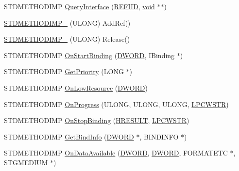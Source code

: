 \begin{DoxyCompactItemize}
\item 
S\+T\+D\+M\+E\+T\+H\+O\+D\+I\+MP \hyperlink{class_callback_a619cd3328d3293073bb26c3e1935724f}{Query\+Interface} (\hyperlink{px__win__ds_8c_a80ec49c8ae61e234197d5071d2df497d}{R\+E\+F\+I\+ID}, \hyperlink{sound_8c_ae35f5844602719cf66324f4de2a658b3}{void} $\ast$$\ast$)
\item 
\hyperlink{class_callback_a2c4397f03d7026fb78521b7367c5e394}{S\+T\+D\+M\+E\+T\+H\+O\+D\+I\+M\+P\+\_\+} (U\+L\+O\+NG) Add\+Ref()
\item 
\hyperlink{class_callback_a494c90c2bb680f8217e2149401f8c053}{S\+T\+D\+M\+E\+T\+H\+O\+D\+I\+M\+P\+\_\+} (U\+L\+O\+NG) Release()
\item 
S\+T\+D\+M\+E\+T\+H\+O\+D\+I\+MP \hyperlink{class_callback_a5cf4c6ba0d72d53b6279cd9a2269b573}{On\+Start\+Binding} (\hyperlink{mapinls_8h_ad342ac907eb044443153a22f964bf0af}{D\+W\+O\+RD}, I\+Binding $\ast$)
\item 
S\+T\+D\+M\+E\+T\+H\+O\+D\+I\+MP \hyperlink{class_callback_a3a9153714f7a5cca8809f1a989f7f65d}{Get\+Priority} (L\+O\+NG $\ast$)
\item 
S\+T\+D\+M\+E\+T\+H\+O\+D\+I\+MP \hyperlink{class_callback_a8ee32df7e5c9e834217e012e4f6e8c6a}{On\+Low\+Resource} (\hyperlink{mapinls_8h_ad342ac907eb044443153a22f964bf0af}{D\+W\+O\+RD})
\item 
S\+T\+D\+M\+E\+T\+H\+O\+D\+I\+MP \hyperlink{class_callback_ac9ae59eb7a86a28d393a514aa70a8f32}{On\+Progress} (U\+L\+O\+NG, U\+L\+O\+NG, U\+L\+O\+NG, \hyperlink{mapinls_8h_a25fda90f83ded0efd5456a4e7eda1e0c}{L\+P\+C\+W\+S\+TR})
\item 
S\+T\+D\+M\+E\+T\+H\+O\+D\+I\+MP \hyperlink{class_callback_a6cb1c47a37eeab4f56358a3e66aa12b4}{On\+Stop\+Binding} (\hyperlink{px__win__ds_8c_a6ad46d30b0323d7b029e41f32f8a2571}{H\+R\+E\+S\+U\+LT}, \hyperlink{mapinls_8h_a25fda90f83ded0efd5456a4e7eda1e0c}{L\+P\+C\+W\+S\+TR})
\item 
S\+T\+D\+M\+E\+T\+H\+O\+D\+I\+MP \hyperlink{class_callback_a615e915e7de6955c3abc4067fa99c1c7}{Get\+Bind\+Info} (\hyperlink{mapinls_8h_ad342ac907eb044443153a22f964bf0af}{D\+W\+O\+RD} $\ast$, B\+I\+N\+D\+I\+N\+FO $\ast$)
\item 
S\+T\+D\+M\+E\+T\+H\+O\+D\+I\+MP \hyperlink{class_callback_af2c1435cbfa3de6f4f31055d905c9151}{On\+Data\+Available} (\hyperlink{mapinls_8h_ad342ac907eb044443153a22f964bf0af}{D\+W\+O\+RD}, \hyperlink{mapinls_8h_ad342ac907eb044443153a22f964bf0af}{D\+W\+O\+RD}, F\+O\+R\+M\+A\+T\+E\+TC $\ast$, S\+T\+G\+M\+E\+D\+I\+UM $\ast$)
$$
\end{DoxyCompactItemize}
